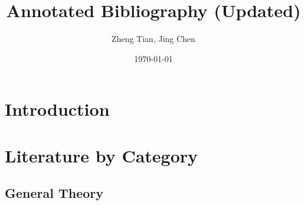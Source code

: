 \documentclass[a4paper,11pt]{article}
\author{Zheng Tian, Jing Chen}
\date{\today}
\title{Annotated Bibliography (Updated)}
\begin{document}
\maketitle


\section{Introduction}
 \label{introduction}

\section{Literature by Category}
\label{lit_category}

\subsection{General Theory}
\end{document}

